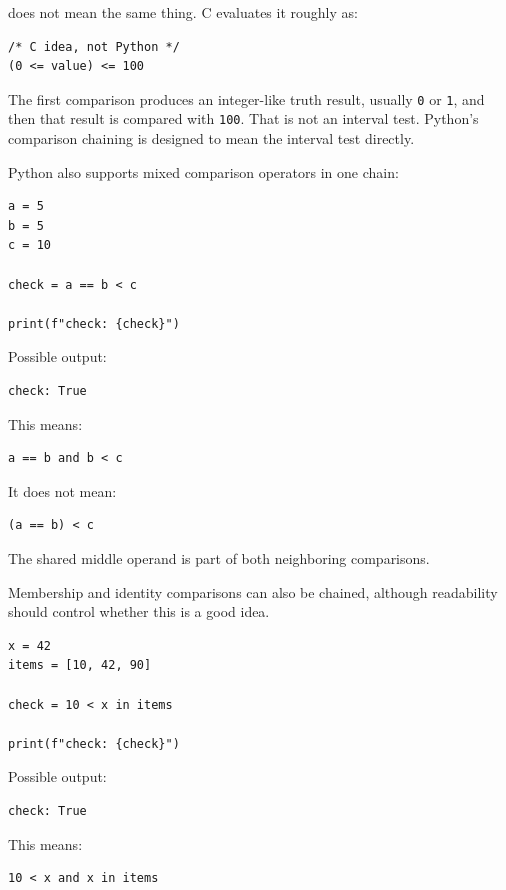 \documentclass[a4paper,twoside]{report}
\begin{document}
does not mean the same thing. C evaluates it roughly as:

\begin{verbatim}
/* C idea, not Python */
(0 <= value) <= 100
\end{verbatim}

The first comparison produces an integer-like truth result, usually \texttt{0} or \texttt{1}, and then that result is compared with \texttt{100}. That is not an interval test. Python's comparison chaining is designed to mean the interval test directly.

Python also supports mixed comparison operators in one chain:

\begin{verbatim}
a = 5
b = 5
c = 10

check = a == b < c

print(f"check: {check}")
\end{verbatim}

Possible output:

\begin{verbatim}
check: True
\end{verbatim}

This means:

\begin{verbatim}
a == b and b < c
\end{verbatim}

It does not mean:

\begin{verbatim}
(a == b) < c
\end{verbatim}

The shared middle operand is part of both neighboring comparisons.

Membership and identity comparisons can also be chained, although readability should control whether this is a good idea.

\begin{verbatim}
x = 42
items = [10, 42, 90]

check = 10 < x in items

print(f"check: {check}")
\end{verbatim}

Possible output:

\begin{verbatim}
check: True
\end{verbatim}

This means:

\begin{verbatim}
10 < x and x in items
\end{verbatim}
\end{document}
